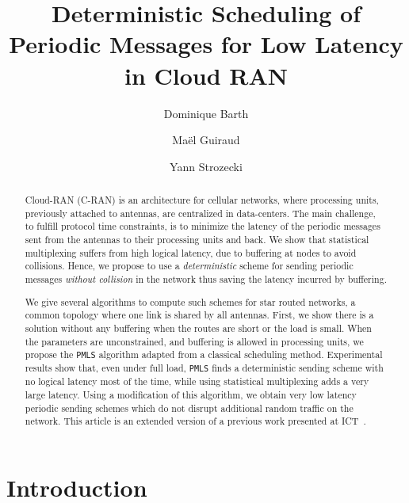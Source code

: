 \documentclass[a4paper,10pt]{journal}
\title{Deterministic Scheduling of Periodic Messages for Low Latency in Cloud RAN}
\author[1]{Dominique Barth}
\author[1,2]{Ma\"el Guiraud}
\author[1]{Yann Strozecki}
\affil[1]{David Laboratory, UVSQ}
\affil[2]{Nokia Bell Labs France}
\newcommand\PMLS{\texttt{PMLS}\xspace}
\begin{document}
\maketitle

\begin{abstract}
Cloud-RAN (C-RAN) is an architecture for cellular networks, where processing units, previously attached to antennas, are centralized in data-centers. The main challenge, to fulfill protocol time constraints, is to minimize the latency of the periodic messages sent from the antennas to their processing units and back. We show that statistical multiplexing suffers from high logical latency, due to buffering at nodes to avoid collisions. Hence, we propose to use a \emph{deterministic} scheme for sending periodic messages \emph{without collision} in the network thus saving the latency incurred by buffering.

We give several algorithms to compute such schemes for star routed networks, a common topology where one link is shared by all antennas. First, we show there is a solution without any buffering when the routes are short or the load is small. When the parameters are unconstrained, and buffering is allowed in processing units, we propose the \PMLS algorithm adapted from a classical scheduling method. Experimental results show that, even under full load,  \PMLS finds a deterministic sending scheme with no logical latency most of the time, while using statistical multiplexing adds a very large latency. Using a modification of this algorithm, we obtain very low latency periodic sending schemes which do not disrupt additional random traffic on the network. This article is an extended version of a previous work presented at ICT~\cite{Guir1806:Deterministic}.
\end{abstract}


\section{Introduction}
\end{document}

